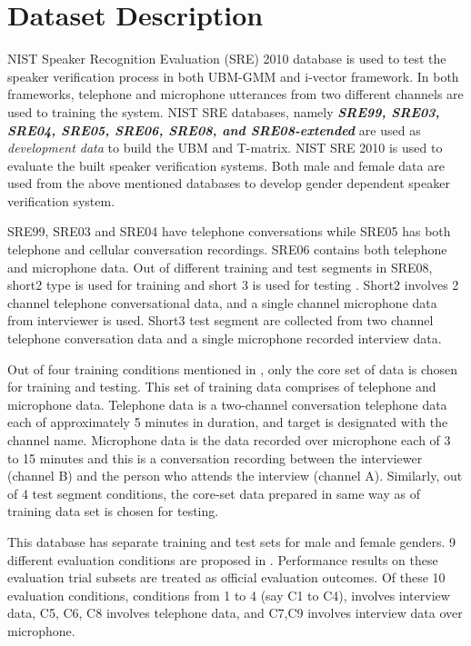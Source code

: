 \documentclass{article}
\begin{document}
\section{Dataset Description}
\label{sec:dB}
NIST Speaker Recognition Evaluation (SRE) 2010 database is used to test the speaker verification process in both UBM-GMM and i-vector framework. In both frameworks, telephone and microphone utterances from two different channels are used to training  the system. NIST SRE databases, namely {\bf {\it SRE99, SRE03, SRE04, SRE05, SRE06, SRE08, and SRE08-extended}} are used as {\it { development data}} to build the UBM and T-matrix. NIST SRE 2010 is used to evaluate the built speaker verification systems. Both male and female data are used from the above mentioned databases to develop gender dependent speaker verification system.

\vspace{0.25cm}
SRE99, SRE03 and SRE04 have telephone conversations while SRE05 has both telephone and cellular conversation recordings. SRE06 contains both telephone and microphone data. Out of different training  and test segments in SRE08, short2 type is used for training   and short 3 is used for testing  \cite{sre2008}. Short2 involves 2 channel telephone conversational data, and a single channel microphone data from interviewer is used. Short3 test segment are collected from two channel telephone conversation data and a single microphone recorded interview data. 

\vspace{0.25cm}
Out of four training  conditions mentioned in  \cite{sre2010}, only the core set of data is chosen for training   and testing. This set of training   data comprises of telephone and microphone data. Telephone data is a two-channel conversation telephone data each of approximately 5 minutes in duration, and target is designated with the channel name.  Microphone data is the data recorded over microphone each of 3 to 15 minutes and this is a conversation recording between the interviewer (channel B) and the person who attends the interview (channel A).  Similarly, out of 4 test segment conditions, the core-set data prepared in same way as of training   data set is chosen for testing.

\vspace{0.25cm}
This database has separate training  and test sets for male and female genders. 9 different evaluation conditions are proposed in  \cite{sre2010}. Performance results on these evaluation trial subsets are treated as official evaluation outcomes. Of these 10 evaluation conditions, conditions from 1 to 4  (say C1 to C4), involves interview data, C5, C6, C8 involves telephone data, and C7,C9 involves interview data over microphone.
\end{document}
